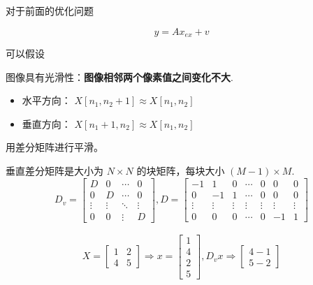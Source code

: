 对于前面的优化问题

\begin{equation}
y=A x_{e x}+v
\end{equation}

可以假设

\begin{proposition}[图像逆问题先验假设]
    图像具有光滑性：\textbf{图像相邻两个像素值之间变化不大}.

    \begin{itemize}
    \item 水平方向： $ X\left[n_{1}, n_{2}+1\right] \approx X\left[n_{1}, n_{2}\right] $
    \item 垂直方向： $ X\left[n_{1}+1, n_{2}\right] \approx X\left[n_{1}, n_{2}\right] $
\end{itemize}
\end{proposition}


用差分矩阵进行平滑。

\begin{definition}[垂直差分矩阵]
    
    垂直差分矩阵是大小为 $ N \times N $ 的块矩阵，每块大小 $ (M-1)   \times M $.
    \begin{equation}D_{v}=\left[\begin{array}{cccc}
        D & 0 & \cdots & 0 \\
        0 & D & \cdots & 0 \\
        \vdots & \vdots & \ddots & \vdots \\
        0 & 0 & \vdots & D
        \end{array}\right], D=\left[\begin{array}{ccccccc}
        -1 & 1 & 0 & \cdots & 0 & 0 & 0 \\
        0 & -1 & 1 & \cdots & 0 & 0 & 0 \\
        \vdots & \vdots & \vdots & \vdots & \vdots & \vdots & \vdots \\
        0 & 0 & 0 & \cdots & 0 & -1 & 1
        \end{array}\right] \end{equation}
\end{definition}

\begin{example}
\begin{equation}
\begin{array}{c}
X=\left[\begin{array}{ll}
1 & 2 \\
4 & 5
\end{array}\right] \Rightarrow x=\left[\begin{array}{l}
1 \\
4 \\
2 \\
5
\end{array}\right], D_{v} x \Rightarrow\left[\begin{array}{l}
4-1 \\
5-2
\end{array}\right]
\end{array}
\end{equation}
\end{example}

